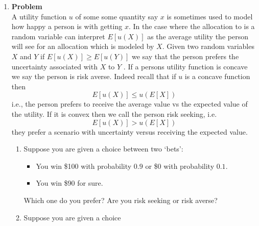 \documentclass[12pt]{article}
\newenvironment{Ex}{\textbf{Problem}\vspace{.75em}\\}{}
\begin{document}
\begin{enumerate}
\begin{Ex}
\begin{solution}
\begin{enumerate}
          Which leads to
          \begin{equation}
            \label{eq:7c-sol}
            \begin{aligned}
              & g(p_1 + p_2)\cdot\left(\frac{p_1}{p_1 + p_2}x_1 +
                \frac{p_2}{p_1 + p_2}x_2 + p_3 \cdot x_3\right) \\
              \ge \quad & (p_1 + p_2)\cdot g\left(\frac{p_1}{p_1 +
                  p_2}x_1 + \frac{p_2}{p_1 + p_2}x_2\right) + p_3
              \cdot g(x_3) \\
            \end{aligned}
          \end{equation}
          And corresponds to \cref{eq:convex-prob}.
        \end{enumerate}
      \end{solution}
    \end{Ex}
  \item
    \begin{Ex}
      A utility function $u$ of some some quantity say $x$ is sometimes
      used to model how happy a person is with getting $x$. In the case
      where the allocation to is a random variable can interpret
      $E[u(X)]$ as the average utility the person will see for an
      allocation which is modeled by $X$. Given two random variables $X$
      and $Y$ if $E [u(X)] \ge E [u(Y)]$ we say that the person prefers
      the uncertainty associated with $X$ to $Y$ . If a persons utility
      function is concave we say the person is risk averse. Indeed
      recall that if $u$ is a concave function then
      $$ E[u(X)] \le u(E[X]) $$
      i.e., the person prefers to receive the average value vs the
      expected value of the utility. If it is convex then we call the
      person risk seeking, i.e.
      $$ E[u(X)] \gt u(E[X]) $$
      they prefer a scenario with uncertainty versus receiving the expected value.
      \begin{enumerate}
      \item Suppose you are given a choice between two `bets':
        \begin{itemize}
        \item You win \$100 with probability $0.9$ or \$0 with
          probability $0.1$.
        \item You win \$90 for sure.
        \end{itemize}
        Which one do you prefer? Are you risk
        seeking or risk averse?
      \item Suppose you are given a choice

\end{enumerate}
\end{Ex}
\end{enumerate}
\end{document}
